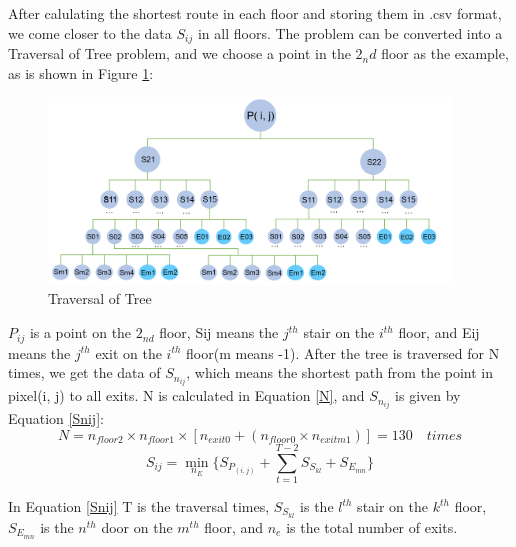 \documentclass{mcmthesis}
\begin{document}
    After calulating the shortest route in each floor and storing them in .csv format, we come closer to the data $S_{ij}$ in all floors. The problem can be converted into a Traversal of Tree problem, and we choose a point in the $2_nd$  floor as the example, as is shown in Figure \ref{tree}:
    \begin{figure}[H]
        \centering
        \includegraphics[width=0.95\textwidth]{tree.png}
        \caption{Traversal of Tree}
        \label{tree}
    \end{figure}

    $P_{ij}$ is a point on the $2_{nd}$ floor, Sij means the $j^{th}$ stair on the $i^{th}$ floor, and Eij means the $j^{th}$ exit on the $i^{th}$ floor(m means -1). After the tree is  traversed for N times, we get the data of $S_{n_{ij}}$, which means the shortest path from the point in pixel(i, j) to all exits. N is calculated in Equation \eqref{N}, and $S_{n_{ij}}$ is given by Equation \eqref{Snij}:
    \begin{equation}
        N = n_{floor2} \times n_{floor1} \times [n_{exit0} + (n_{floor0} \times n_{exitm1} ) ] = 130 \quad times
    \label{N}
    \end{equation}
    \begin{equation}
        S_{ij} = \min\limits_{n_E} \{S_{P_{(i,j)}}+ {\sum\limits_{t = 1}^{T-2} S_{S_{kl}}}  + S_{E_{mn}} \}
    \label{Snij}
    \end{equation}

    In Equation \eqref{Snij} T is the traversal times, $S_{S_{kl}}$ is the $l^{th}$ stair on the $k^{th}$ floor, $S_{E_{mn}}$ is the $n^{th}$ door on the $m^{th}$ floor, and $n_e$ is the total number of exits.
\end{document}
